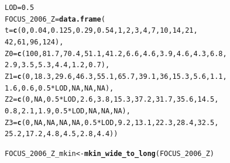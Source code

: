 \documentclass[12pt,a4paper]{article}\usepackage[]{graphicx}\usepackage[]{color}
\makeatletter
\newcommand{\hlnum}[1]{\textcolor[rgb]{0.686,0.059,0.569}{#1}}%
\newcommand{\hlopt}[1]{\textcolor[rgb]{0,0,0}{#1}}%
\newcommand{\hlstd}[1]{\textcolor[rgb]{0.345,0.345,0.345}{#1}}%
\newcommand{\hlkwb}[1]{\textcolor[rgb]{0.69,0.353,0.396}{#1}}%
\newcommand{\hlkwc}[1]{\textcolor[rgb]{0.333,0.667,0.333}{#1}}%
\newcommand{\hlkwd}[1]{\textcolor[rgb]{0.737,0.353,0.396}{\textbf{#1}}}%
\newenvironment{kframe}{%
 \def\at@end@of@kframe{}%
 \ifinner\ifhmode%
  \def\at@end@of@kframe{\end{minipage}}%
  \begin{minipage}{\columnwidth}%
 \fi\fi%
 \def\FrameCommand##1{\hskip\@totalleftmargin \hskip-\fboxsep
 \colorbox{shadecolor}{##1}\hskip-\fboxsep
     \hskip-\linewidth \hskip-\@totalleftmargin \hskip\columnwidth}%
 \MakeFramed {\advance\hsize-\width
   \@totalleftmargin\z@ \linewidth\hsize
   \@setminipage}}%
 {\par\unskip\endMakeFramed%
 \at@end@of@kframe}
\newenvironment{knitrout}{}{} %
\makeatother
\begin{document}
\begin{knitrout}
\begin{kframe}
{\ttfamily\noindent\itshape\color{messagecolor}{\#\# Loading required package: parallel}}\begin{alltt}
\hlstd{LOD} \hlkwb{=} \hlnum{0.5}
\hlstd{FOCUS_2006_Z} \hlkwb{=} \hlkwd{data.frame}\hlstd{(}
  \hlkwc{t} \hlstd{=} \hlkwd{c}\hlstd{(}\hlnum{0}\hlstd{,} \hlnum{0.04}\hlstd{,} \hlnum{0.125}\hlstd{,} \hlnum{0.29}\hlstd{,} \hlnum{0.54}\hlstd{,} \hlnum{1}\hlstd{,} \hlnum{2}\hlstd{,} \hlnum{3}\hlstd{,} \hlnum{4}\hlstd{,} \hlnum{7}\hlstd{,} \hlnum{10}\hlstd{,} \hlnum{14}\hlstd{,} \hlnum{21}\hlstd{,}
        \hlnum{42}\hlstd{,} \hlnum{61}\hlstd{,} \hlnum{96}\hlstd{,} \hlnum{124}\hlstd{),}
  \hlkwc{Z0} \hlstd{=} \hlkwd{c}\hlstd{(}\hlnum{100}\hlstd{,} \hlnum{81.7}\hlstd{,} \hlnum{70.4}\hlstd{,} \hlnum{51.1}\hlstd{,} \hlnum{41.2}\hlstd{,} \hlnum{6.6}\hlstd{,} \hlnum{4.6}\hlstd{,} \hlnum{3.9}\hlstd{,} \hlnum{4.6}\hlstd{,} \hlnum{4.3}\hlstd{,} \hlnum{6.8}\hlstd{,}
         \hlnum{2.9}\hlstd{,} \hlnum{3.5}\hlstd{,} \hlnum{5.3}\hlstd{,} \hlnum{4.4}\hlstd{,} \hlnum{1.2}\hlstd{,} \hlnum{0.7}\hlstd{),}
  \hlkwc{Z1} \hlstd{=} \hlkwd{c}\hlstd{(}\hlnum{0}\hlstd{,} \hlnum{18.3}\hlstd{,} \hlnum{29.6}\hlstd{,} \hlnum{46.3}\hlstd{,} \hlnum{55.1}\hlstd{,} \hlnum{65.7}\hlstd{,} \hlnum{39.1}\hlstd{,} \hlnum{36}\hlstd{,} \hlnum{15.3}\hlstd{,} \hlnum{5.6}\hlstd{,} \hlnum{1.1}\hlstd{,}
         \hlnum{1.6}\hlstd{,} \hlnum{0.6}\hlstd{,} \hlnum{0.5} \hlopt{*} \hlstd{LOD,} \hlnum{NA}\hlstd{,} \hlnum{NA}\hlstd{,} \hlnum{NA}\hlstd{),}
  \hlkwc{Z2} \hlstd{=} \hlkwd{c}\hlstd{(}\hlnum{0}\hlstd{,} \hlnum{NA}\hlstd{,} \hlnum{0.5} \hlopt{*} \hlstd{LOD,} \hlnum{2.6}\hlstd{,} \hlnum{3.8}\hlstd{,} \hlnum{15.3}\hlstd{,} \hlnum{37.2}\hlstd{,} \hlnum{31.7}\hlstd{,} \hlnum{35.6}\hlstd{,} \hlnum{14.5}\hlstd{,}
         \hlnum{0.8}\hlstd{,} \hlnum{2.1}\hlstd{,} \hlnum{1.9}\hlstd{,} \hlnum{0.5} \hlopt{*} \hlstd{LOD,} \hlnum{NA}\hlstd{,} \hlnum{NA}\hlstd{,} \hlnum{NA}\hlstd{),}
  \hlkwc{Z3} \hlstd{=} \hlkwd{c}\hlstd{(}\hlnum{0}\hlstd{,} \hlnum{NA}\hlstd{,} \hlnum{NA}\hlstd{,} \hlnum{NA}\hlstd{,} \hlnum{NA}\hlstd{,} \hlnum{0.5} \hlopt{*} \hlstd{LOD,} \hlnum{9.2}\hlstd{,} \hlnum{13.1}\hlstd{,} \hlnum{22.3}\hlstd{,} \hlnum{28.4}\hlstd{,} \hlnum{32.5}\hlstd{,}
         \hlnum{25.2}\hlstd{,} \hlnum{17.2}\hlstd{,} \hlnum{4.8}\hlstd{,} \hlnum{4.5}\hlstd{,} \hlnum{2.8}\hlstd{,} \hlnum{4.4}\hlstd{))}

\hlstd{FOCUS_2006_Z_mkin} \hlkwb{<-} \hlkwd{mkin_wide_to_long}\hlstd{(FOCUS_2006_Z)}
\end{alltt}
\end{kframe}
\end{knitrout}
\end{document}

